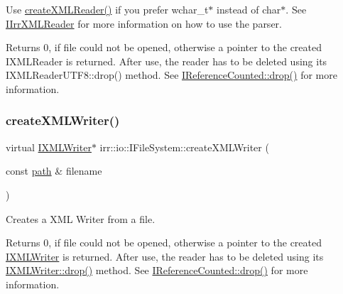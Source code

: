 Use \hyperlink{classirr_1_1io_1_1IFileSystem_a167c9fa159d16ee5c56c074636b0865e}{create\+X\+M\+L\+Reader()} if you prefer wchar\+\_\+t$\ast$ instead of char$\ast$. See \hyperlink{classirr_1_1io_1_1IIrrXMLReader}{I\+Irr\+X\+M\+L\+Reader} for more information on how to use the parser. \begin{DoxyReturn}{Returns}
0, if file could not be opened, otherwise a pointer to the created I\+X\+M\+L\+Reader is returned. After use, the reader has to be deleted using its I\+X\+M\+L\+Reader\+U\+T\+F8\+::drop() method. See \hyperlink{classirr_1_1IReferenceCounted_a03856a09355b89d178090c4a5f738543}{I\+Reference\+Counted\+::drop()} for more information. 
\end{DoxyReturn}
\mbox{\label{classirr_1_1io_1_1IFileSystem_a0737712d1c90001e5765ef46912c616d}} 
\subsubsection{\texorpdfstring{create\+X\+M\+L\+Writer()}{createXMLWriter()}\hspace{0.1cm}{\footnotesize\ttfamily [1/2]}}
{\footnotesize\ttfamily virtual \hyperlink{classirr_1_1io_1_1IXMLWriter}{I\+X\+M\+L\+Writer}$\ast$ irr\+::io\+::\+I\+File\+System\+::create\+X\+M\+L\+Writer (\begin{DoxyParamCaption}\item[{const \hyperlink{namespaceirr_1_1io_ab1bdc45edb3f94d8319c02bc0f840ee1}{path} \&}]{filename }\end{DoxyParamCaption})\hspace{0.3cm}{\ttfamily [pure virtual]}}



Creates a X\+ML Writer from a file. 

\begin{DoxyReturn}{Returns}
0, if file could not be opened, otherwise a pointer to the created \hyperlink{classirr_1_1io_1_1IXMLWriter}{I\+X\+M\+L\+Writer} is returned. After use, the reader has to be deleted using its \hyperlink{classirr_1_1IReferenceCounted_a03856a09355b89d178090c4a5f738543}{I\+X\+M\+L\+Writer\+::drop()} method. See \hyperlink{classirr_1_1IReferenceCounted_a03856a09355b89d178090c4a5f738543}{I\+Reference\+Counted\+::drop()} for more information. 
\end{DoxyReturn}
\mbox{\label{classirr_1_1io_1_1IFileSystem_ac2bcaf8c338e80ff579061b7056c06da}} 
